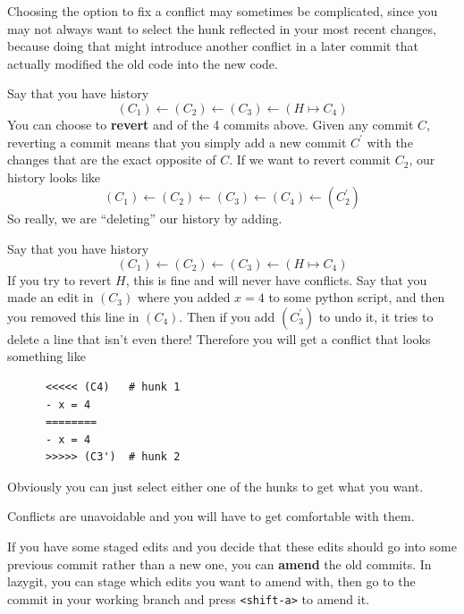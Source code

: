   Choosing the option to fix a conflict may sometimes be complicated, since you may not always want to select the hunk reflected in your most recent changes, because doing that might introduce another conflict in a later commit that actually modified the old code into the new code. 

  \begin{definition} 
    Say that you have history
    \begin{equation}
      (C_1) \leftarrow (C_2) \leftarrow (C_3) \leftarrow (H \mapsto C_4)
    \end{equation} 
    You can choose to \textbf{revert} and of the 4 commits above. Given any commit $C$, reverting a commit means that you simply add a new commit $C^\prime$ with the changes that are the exact opposite of $C$. If we want to revert commit $C_2$, our history looks like 
    \begin{equation}
      (C_1) \leftarrow (C_2) \leftarrow (C_3) \leftarrow (C_4) \leftarrow (C_2^\prime)
    \end{equation}  
    So really, we are ``deleting'' our history by adding. 
  \end{definition} 

  \begin{example}
    Say that you have history
    \begin{equation}
      (C_1) \leftarrow (C_2) \leftarrow (C_3) \leftarrow (H \mapsto C_4)
    \end{equation} 
    If you try to revert $H$, this is fine and will never have conflicts. Say that you made an edit in $(C_3)$ where you added $x = 4$ to some python script, and then you removed this line in $(C_4)$. Then if you add $(C_3^\prime)$ to undo it, it tries to delete a line that isn't even there! Therefore you will get a conflict that looks something like 
    \begin{lstlisting}
      <<<<< (C4)   # hunk 1 
      - x = 4 
      ========
      - x = 4
      >>>>> (C3')  # hunk 2
    \end{lstlisting}
    Obviously you can just select either one of the hunks to get what you want. 
  \end{example} 

  Conflicts are unavoidable and you will have to get comfortable with them.  

  \begin{definition}
    If you have some staged edits and you decide that these edits should go into some previous commit rather than a new one, you can \textbf{amend} the old commits. In lazygit, you can stage which edits you want to amend with, then go to the commit in your working branch and press \texttt{<shift-a>} to amend it. 
  \end{definition}

